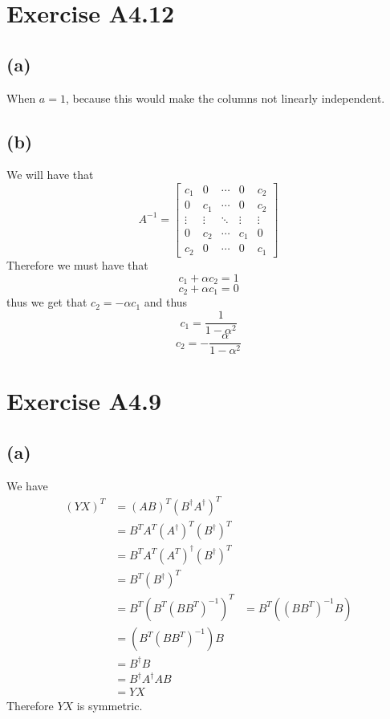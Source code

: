 \section*{Exercise A4.12}
\subsection*{(a)}
When $a=1$, because this would make the columns not linearly independent.
\subsection*{(b)}
We will have that 
$$A^{-1}=\begin{bmatrix}
    c_1 & 0 & \cdots & 0 & c_2\\
    0 & c_1 & \cdots & 0 & c_2\\
    \vdots & \vdots & \ddots & \vdots & \vdots\\
    0 & c_2 & \cdots & c_1 & 0\\
    c_2 & 0 & \cdots & 0 & c_1
\end{bmatrix}$$
Therefore we must have that 
$$c_1+\alpha c_2=1$$
$$c_2+\alpha c_1=0$$
thus we get that $c_2=-\alpha c_1$ and thus
$$c_1=\frac{1}{1-\alpha^2}$$
$$c_2=-\frac{\alpha}{1-\alpha^2}$$
\section*{Exercise A4.9}
\subsection*{(a)}
We have 
\begin{align*}
    (YX)^T&=\left(AB\right)^T\left(B^{\dagger}A^{\dagger}\right)^T\\
    &=B^TA^T\left(A^{\dagger}\right)^T\left(B^{\dagger}\right)^T\\
    &=B^TA^T\left(A^T\right)^{\dagger}\left(B^{\dagger}\right)^T\\
    &=B^T\left(B^{\dagger}\right)^T\\
    &=B^T\left(B^T(BB^T)^{-1}\right)^T
    &=B^T\left((BB^T)^{-1}B\right)\\
    &=\left(B^T(BB^T)^{-1}\right)B\\
    &=B^{\dagger}B\\
    &=B^{\dagger}A^{\dagger}AB\\
    &=YX
\end{align*}
Therefore $YX$ is symmetric.
